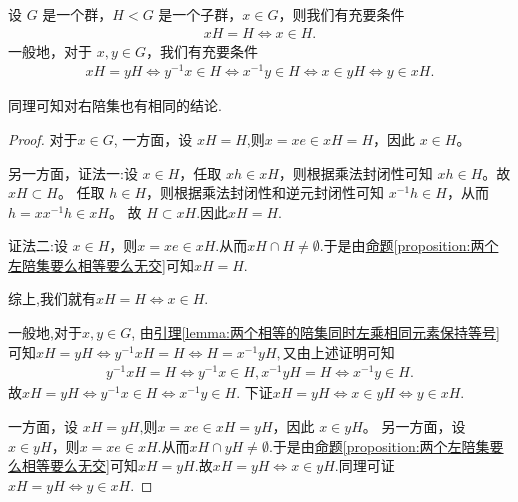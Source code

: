 \documentclass[../../main.tex]{subfiles}
\begin{document}
\begin{lemma}\label{lemma:关于两个陪集相等的充要条件}
设 \(G\) 是一个群，\(H < G\) 是一个子群，\(x \in G\)，则我们有充要条件
\begin{align*}
xH = H \iff x \in H .
\end{align*}
一般地，对于 \(x, y \in G\)，我们有充要条件
\begin{align*}
xH = yH \iff y^{-1}x \in H \iff x^{-1}y \in H \iff x\in yH \iff y\in xH.
\end{align*}
\end{lemma}
\begin{note}
同理可知对右陪集也有相同的结论.
\end{note}
\begin{proof}
对于$x\in G$,
一方面，设 \(xH = H\),则\(x = xe \in xH = H\)，因此 \(x \in H\)。

另一方面，{\color{blue}证法一:}设 \(x \in H\)，任取 \(xh \in xH\)，则根据乘法封闭性可知 \(xh \in H\)。故 \(xH \subset H\)。
任取 \(h \in H\)，则根据乘法封闭性和逆元封闭性可知 \(x^{-1}h \in H\)，从而 \(h = xx^{-1}h \in xH\)。 故 \(H \subset xH\).因此$xH=H$.

{\color{blue}证法二:}设 \(x \in H\)，则$x=xe\in xH$.从而$xH \cap H\ne \emptyset$.于是由\hyperref[proposition:两个左陪集要么相等要么无交]{命题\ref{proposition:两个左陪集要么相等要么无交}}可知$xH=H$.

综上,我们就有$xH = H \iff x \in H .$

一般地,对于$x,y\in G$,
由\hyperref[lemma:两个相等的陪集同时左乘相同元素保持等号]{引理\ref{lemma:两个相等的陪集同时左乘相同元素保持等号}}可知\(xH=yH\Leftrightarrow y^{-1}xH=H\Leftrightarrow H=x^{-1}yH,\)又由上述证明可知
\begin{align*}
y^{-1}xH=H\Longleftrightarrow y^{-1}x\in H,x^{-1}yH=H\Longleftrightarrow x^{-1}y\in H.
\end{align*}
故$xH = yH \iff y^{-1}x \in H \iff x^{-1}y \in H.$
下证$xH=yH \iff x\in yH \iff y\in xH.$

一方面，设 \(xH = yH\),则\(x = xe \in xH = yH\)，因此 \(x \in yH\)。
另一方面，设 \(x \in yH\)，则$x=xe\in xH$.从而$xH \cap yH\ne \emptyset$.于是由\hyperref[proposition:两个左陪集要么相等要么无交]{命题\ref{proposition:两个左陪集要么相等要么无交}}可知$xH=yH$.故$xH=yH \iff x\in yH$.同理可证$xH=yH \iff y\in xH$.
\end{proof}
\end{document}
